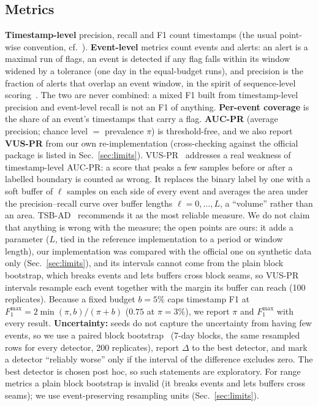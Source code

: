 \documentclass[10pt,twocolumn]{article}
\newcommand{\F}{F_1}
\begin{document}
\subsection{Metrics}
\textbf{Timestamp-level} precision, recall and F1 count timestamps (the usual point-wise convention, cf.~\cite{kim2022rigorous}). \textbf{Event-level} metrics count events and alerts: an alert is a maximal run of flags, an event is detected if any flag falls within its window widened by a tolerance (one day in the equal-budget runs), and precision is the fraction of alerts that overlap an event window, in the spirit of sequence-level scoring~\cite{hundman2018telemanom,tatbul2018precision}. The two are never combined: a mixed F1 built from timestamp-level precision and event-level recall is not an F1 of anything. \textbf{Per-event coverage} is the share of an event's timestamps that carry a flag. \textbf{AUC-PR} (average precision; chance level $=$ prevalence $\pi$) is threshold-free, and we also report \textbf{VUS-PR} from our own re-implementation (cross-checking against the official package is listed in Sec.~\ref{sec:limits}). VUS-PR~\cite{paparrizos2022vus} addresses a real weakness of timestamp-level AUC-PR: a score that peaks a few samples before or after a labelled boundary is counted as wrong. It replaces the binary label by one with a soft buffer of $\ell$ samples on each side of every event and averages the area under the precision--recall curve over buffer lengths $\ell=0,\dots,L$, a ``volume'' rather than an area. TSB-AD~\cite{liu2024elephant} recommends it as the most reliable measure. We do not claim that anything is wrong with the measure; the open points are ours: it adds a parameter ($L$, tied in the reference implementation to a period or window length), our implementation was compared with the official one on synthetic data only (Sec.~\ref{sec:limits}), and its intervals cannot come from the plain block bootstrap, which breaks events and lets buffers cross block seams, so VUS-PR intervals resample each event together with the margin its buffer can reach (100 replicates). Because a fixed budget $b=5\%$ caps timestamp F1 at $\F^{\max}=2\min(\pi,b)/(\pi+b)$ ($0.75$ at $\pi=3\%$), we report $\pi$ and $\F^{\max}$ with every result. \textbf{Uncertainty:} seeds do not capture the uncertainty from having few events, so we use a paired block bootstrap~\cite{kunsch1989jackknife,politis1994stationary} (7-day blocks, the same resampled rows for every detector, 200 replicates), report $\Delta$ to the best detector, and mark a detector ``reliably worse'' only if the interval of the difference excludes zero. The best detector is chosen post hoc, so such statements are exploratory. For range metrics a plain block bootstrap is invalid (it breaks events and lets buffers cross seams); we use event-preserving resampling units (Sec.~\ref{sec:limits}).
\end{document}

